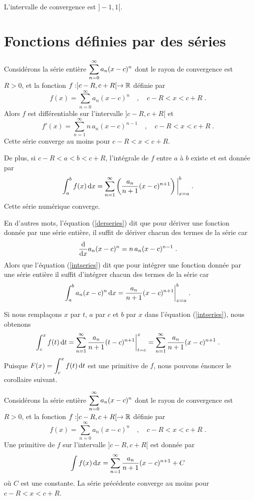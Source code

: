 {\begin{egg}
L'intervalle de convergence est $]-1,1[$.
\end{egg}

\section{Fonctions définies par des séries}

\begin{theorem} \label{der_int_series}
Considérons la série entière $\DS \sum_{n=0}^\infty a_n (x-c)^n$
dont le rayon de convergence est $R>0$, et la fonction
$f:]c-R,c+R[\rightarrow \RR$ définie par
\[
f(x) = \sum_{n=0}^\infty a_n (x-c)^n \quad , \quad c-R<x<c+R \; .
\]
Alors $f$ est différentiable sur l'intervalle $]c-R,c+R[$ et
\begin{equation}\label{derseries}
f'(x) = \sum_{n=1}^\infty n\,a_n (x-c)^{n-1} \quad , \quad c-R<x<c+R \; .
\end{equation}
Cette série converge au moins pour $c-R<x<c+R$.

De plus, si $c-R<a<b<c+R$, l'intégrale de $f$ entre $a$
à $b$ existe et est donnée par
\begin{equation}\label{intseries}
\int_a^b f(x) \dx{x} =
\sum_{n=1}^\infty \left(\frac{a_n}{n+1} (x-c)^{n+1}\right) \bigg|_{x=a}^b \; .
\end{equation}
Cette série numérique converge.
\end{theorem}

\begin{rmk}
En d'autres mots, l'équation (\ref{derseries}) dit que pour dériver une
fonction donnée par une série entière, il suffit de dériver chacun des termes
de la série car
\[
\dfdx{a_n (x-c)^n}{x} = n\, a_n (x-c)^{n-1} \; .
\]
Alors que l'équation (\ref{intseries}) dit que pour intégrer
une fonction donnée par une série entière il suffit d'intégrer chacun des
termes de la série car
\[
\int_a^b a_n (x-c)^n \dx{x} 
= \frac{a_n}{n+1} (x-c)^{n+1} \bigg|_{x=a}^b \; .
\]
\end{rmk}

Si nous remplaçons $x$ par $t$, $a$ par $c$ et $b$ par $x$ dans l'équation
(\ref{intseries}), nous obtenons
\[
\int_c^x f(t) \dx{t} =
\sum_{n=1}^\infty \frac{a_n}{n+1} (t-c)^{n+1} \bigg|_{t=c}^x
= \sum_{n=1}^\infty \frac{a_n}{n+1} (x-c)^{n+1} \;.
\]
Puisque $\DS F(x) = \int_c^x f(t) \dx{t}$ est une primitive
de $f$, nous pouvons énoncer le corollaire suivant.

\begin{cor}
Considérons la série entière $\DS \sum_{n=0}^\infty a_n (x-c)^n$
dont le rayon de convergence est $R>0$, et la fonction
$f:]c-R,c+R[\rightarrow \RR$ définie par
\[
f(x) = \sum_{n=0}^\infty a_n (x-c)^n \quad , \quad c-R<x<c+R \; .
\]
Une primitive de $f$ sur l'intervalle $]c-R,c+R[$ est donnée
par
\[
\int f(x) \dx{x} = \sum_{n=1}^\infty \frac{a_n}{n+1} (x-c)^{n+1} +C
\]
où $C$ est une constante.  La série précédente converge au moins pour
$c-R<x<c+R$.
\end{cor}

}
